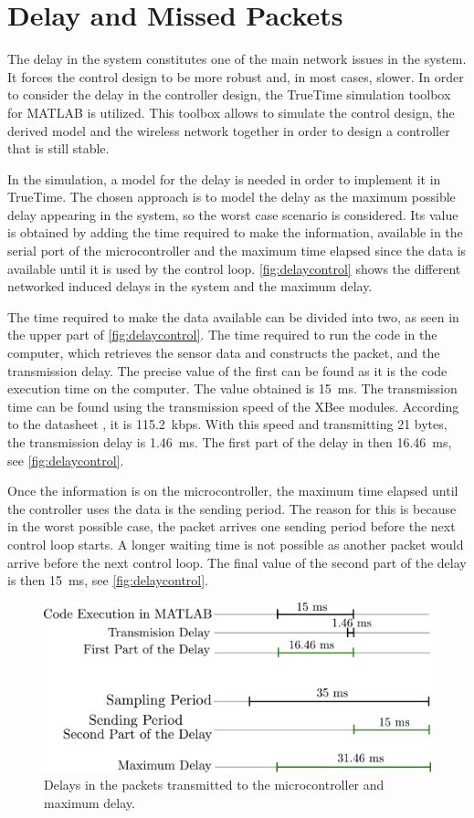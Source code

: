 \section{Delay and Missed Packets}
The delay in the system constitutes one of the main network issues in the system. It forces the control design to be more robust and, in most cases, slower. In order to consider the delay in the controller design, the TrueTime simulation toolbox for MATLAB is utilized. This toolbox allows to simulate the control design, the derived model and the wireless network together in order to design a controller that is still stable.

In the simulation, a model for the delay is needed in order to implement it in TrueTime. The chosen approach is to model the delay as the maximum possible delay appearing in the system, so the worst case scenario is considered. Its value is obtained by adding the time required to make the information, available in the serial port of the microcontroller and the maximum time elapsed since the data is available until it is used by the control loop. \autoref{fig:delaycontrol} shows the different networked induced delays in the system and the maximum delay.  

The time required to make the data available can be divided into two, as seen in the upper part of \autoref{fig:delaycontrol}. The time required to run the code in the computer, which retrieves the sensor data and constructs the packet, and the transmission delay. The precise value of the first can be found as it is the code execution time on the computer. The value obtained is \SI{15}{ms}. The transmission time can be found using the transmission speed of the XBee modules. According to the datasheet \cite{XBee}, it is \SI{115.2}{kbps}. With this speed and transmitting 21 bytes, the transmission delay is \SI{1.46}{ms}. The first part of the delay in then \SI{16.46}{ms}, see \autoref{fig:delaycontrol}.

Once the information is on the microcontroller, the maximum time elapsed until the controller uses the data is the sending period. The reason for this is because in the worst possible case, the packet arrives one sending period before the next control loop starts. A longer waiting time is not possible as another packet would arrive before the next control loop. The final value of the second part of the delay is then \SI{15}{ms}, see \autoref{fig:delaycontrol}.
 
\begin{figure}[H]
	\centering
	\includegraphics[width=.6\textwidth]{figures/maxDelay.pdf}
	\caption{Delays in the packets transmitted to the microcontroller and maximum delay.}
	\label{fig:delaycontrol}
\end{figure}

